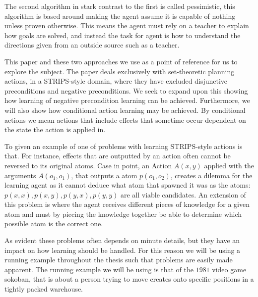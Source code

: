 \documentclass[Master.tex]{subfiles}
\begin{document}
	The second algorithm in stark contrast to the first is called pessimistic, this algorithm is based around making the agent assume it is capable of nothing unless proven otherwise. This means the agent must rely on a teacher to explain how goals are solved, and instead the task for agent is how to understand the directions given from an outside source such as a teacher.
	
	This paper and these two approaches we use as a point of reference for us to explore the subject.  The paper deals exclusively with set-theoretic planning actions, in a STRIPS-style domain, where they have excluded disjunctive preconditions and negative preconditions. 
	We seek to expand upon this showing how learning of negative precondition learning can be achieved. Furthermore, we will also show how conditional action learning may be achieved. By conditional actions we mean actions that include effects that sometime occur dependent on the state the action is applied in.
	
	
	To given an example of one of problems with learning STRIPS-style actions is that. For instance, effects that are outputted by an action often cannot be reversed to its original atoms. Case in point, an Action $A(x,y)$ applied with the arguments $A(o_1,o_1)$, that outputs a atom $p(o_1,o_2)$, creates a dilemma for the learning agent as it cannot deduce what atom that spawned it was as the atoms: $p(x,x), p(x,y), p(y,x), p(y,y)$ are all viable candidates. An extension of this problem is where the agent receives different pieces of knowledge for a given atom and must by piecing the knowledge together be able to determine which possible atom is the correct one.
	
	As evident these problems often depends on minute details, but they have an impact on how learning should be handled. For this reason we will be using a running example throughout the thesis such that problems are easily made apparent. The running example we will be using is that of the $1981$ video game sokoban, that is about a person trying to move creates onto specific positions in a tightly packed warehouse.
	
\end{document}
